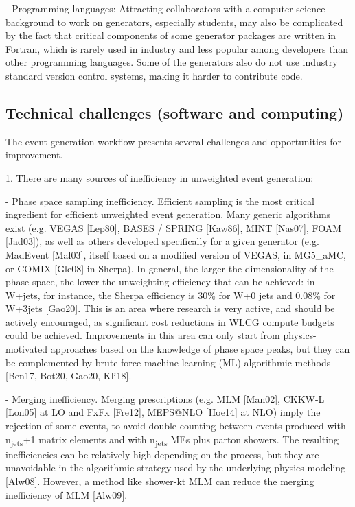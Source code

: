 \documentclass[10pt,a4paper]{article}
\begin{document}
- {Programming languages}: Attracting collaborators with a computer
science background to work on generators, especially students, may also
be complicated by the fact that critical components of some generator
packages are written in Fortran, which is rarely used in industry and
less popular among developers than other programming languages. Some of
the generators also do not use industry standard version control
systems, making it harder to contribute code.

\hypertarget{technical-challenges-software-and-computing}{%
\subsection{Technical challenges (software and
computing)}\label{technical-challenges-software-and-computing}}

The event generation workflow presents several challenges and
opportunities for improvement.

1. There are many sources of inefficiency in unweighted event
generation:

- {Phase space sampling inefficiency}. Efficient sampling is the most
critical ingredient for efficient unweighted event generation. Many
generic algorithms exist (e.g. VEGAS {[}Lep80{]}, BASES / SPRING
{[}Kaw86{]}, MINT {[}Nas07{]}, FOAM {[}Jad03{]}), as well as others
developed specifically for a given generator (e.g. MadEvent {[}Mal03{]},
itself based on a modified version of VEGAS, in MG5\_aMC, or COMIX
{[}Gle08{]} in Sherpa). In general, the larger the dimensionality of the
phase space, the lower the unweighting efficiency that can be achieved:
in W+jets, for instance, the Sherpa efficiency is 30\% for W+0 jets and
0.08\% for W+3jets {[}Gao20{]}. This is an area where research is very
active, and should be actively encouraged, as significant cost
reductions in WLCG compute budgets could be achieved. Improvements in
this area can only start from physics-motivated approaches based on the
knowledge of phase space peaks, but they can be complemented by
brute-force machine learning (ML) algorithmic methods {[}Ben17, Bot20,
Gao20, Kli18{]}.

- {Merging inefficiency}. Merging prescriptions (e.g. MLM {[}Man02{]},
CKKW-L {[}Lon05{]} at LO and FxFx {[}Fre12{]}, MEPS@NLO {[}Hoe14{]} at
NLO) imply the rejection of some events, to avoid double counting
between events produced with n\textsubscript{jets}+1 matrix elements and
with n\textsubscript{jets} MEs plus parton showers. The resulting
inefficiencies can be relatively high depending on the process, but they
are unavoidable in the algorithmic strategy used by the underlying
physics modeling {[}Alw08{]}. However, a method like shower-kt MLM can
reduce the merging inefficiency of MLM {[}Alw09{]}.
\end{document}
